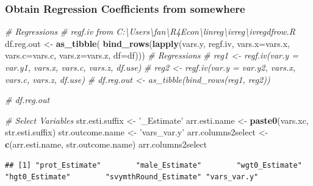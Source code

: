 \documentclass[
]{book}
\newenvironment{Shaded}{\begin{snugshade}}{\end{snugshade}}
\newcommand{\CommentTok}[1]{\textcolor[rgb]{0.56,0.35,0.01}{\textit{#1}}}
\newcommand{\DataTypeTok}[1]{\textcolor[rgb]{0.13,0.29,0.53}{#1}}
\newcommand{\KeywordTok}[1]{\textcolor[rgb]{0.13,0.29,0.53}{\textbf{#1}}}
\newcommand{\NormalTok}[1]{#1}
\newcommand{\StringTok}[1]{\textcolor[rgb]{0.31,0.60,0.02}{#1}}
\begin{document}
\hypertarget{obtain-regression-coefficients-from-somewhere}{%
\subsubsection{Obtain Regression Coefficients from somewhere}\label{obtain-regression-coefficients-from-somewhere}}

\begin{Shaded}
\begin{Highlighting}[]
\CommentTok{# Regressions}
\CommentTok{# regf.iv from C:\textbackslash{}Users\textbackslash{}fan\textbackslash{}R4Econ\textbackslash{}linreg\textbackslash{}ivreg\textbackslash{}ivregdfrow.R}
\NormalTok{df.reg.out <-}\StringTok{ }\KeywordTok{as_tibble}\NormalTok{(}
  \KeywordTok{bind_rows}\NormalTok{(}\KeywordTok{lapply}\NormalTok{(vars.y, regf.iv,}
                   \DataTypeTok{vars.x=}\NormalTok{vars.x, }\DataTypeTok{vars.c=}\NormalTok{vars.c, }\DataTypeTok{vars.z=}\NormalTok{vars.z, }\DataTypeTok{df=}\NormalTok{df)))}
\CommentTok{# Regressions}
\CommentTok{# reg1 <- regf.iv(var.y = var.y1, vars.x, vars.c, vars.z, df.use)}
\CommentTok{# reg2 <- regf.iv(var.y = var.y2, vars.x, vars.c, vars.z, df.use)}
\CommentTok{# df.reg.out <- as_tibble(bind_rows(reg1, reg2))}
\end{Highlighting}
\end{Shaded}

\begin{Shaded}
\begin{Highlighting}[]
\CommentTok{# df.reg.out}
\end{Highlighting}
\end{Shaded}

\begin{Shaded}
\begin{Highlighting}[]
\CommentTok{# Select Variables}
\NormalTok{str.esti.suffix <-}\StringTok{ '_Estimate'}
\NormalTok{arr.esti.name <-}\StringTok{ }\KeywordTok{paste0}\NormalTok{(vars.xc, str.esti.suffix)}
\NormalTok{str.outcome.name <-}\StringTok{ 'vars_var.y'}
\NormalTok{arr.columns2select <-}\StringTok{ }\KeywordTok{c}\NormalTok{(arr.esti.name, str.outcome.name)}
\NormalTok{arr.columns2select}
\end{Highlighting}
\end{Shaded}

\begin{verbatim}
## [1] "prot_Estimate"        "male_Estimate"        "wgt0_Estimate"        "hgt0_Estimate"        "svymthRound_Estimate" "vars_var.y"
\end{verbatim}
\end{document}
